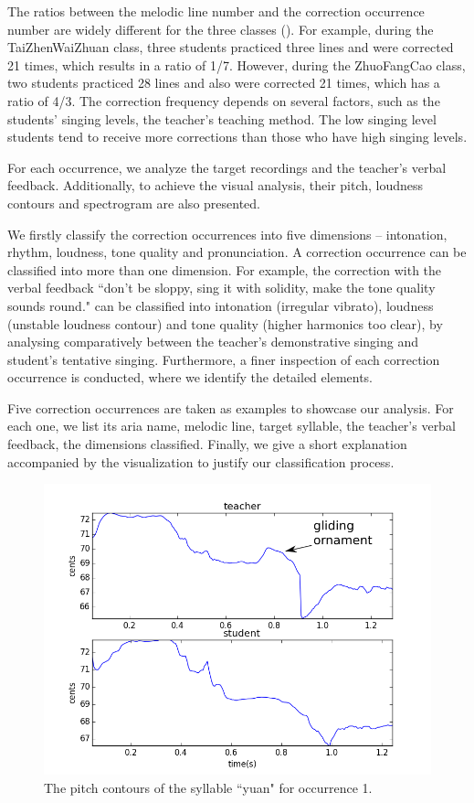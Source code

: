 The ratios between the melodic line number and the correction occurrence number are widely different for the three classes (). For example, during the TaiZhenWaiZhuan class, three students practiced three lines and were corrected 21 times, which results in a ratio of 1/7. However, during the ZhuoFangCao class, two students practiced 28 lines and also were corrected 21 times, which has a ratio of 4/3. The correction frequency depends on several factors, such as the students' singing levels, the teacher's teaching method. The low singing level students tend to receive more corrections than those who have high singing levels.

For each occurrence, we analyze the target recordings and the teacher's verbal feedback. Additionally, to achieve the visual analysis, their pitch, loudness contours and spectrogram are also presented.

We firstly classify the correction occurrences into five dimensions -- intonation, rhythm, loudness, tone quality and pronunciation. A correction occurrence can be classified into more than one dimension. For example, the correction with the verbal feedback ``don't be sloppy, sing it with solidity, make the tone quality sounds round." can be classified into intonation (irregular vibrato), loudness (unstable loudness contour) and tone quality (higher harmonics too clear), by analysing comparatively between the teacher's demonstrative singing and student's tentative singing. Furthermore, a finer inspection of each correction occurrence is conducted, where we identify the detailed elements.

Five correction occurrences are taken as examples to showcase our analysis. For each one, we list its aria name, melodic line, target syllable, the teacher's verbal feedback, the dimensions classified. Finally, we give a short explanation accompanied by the visualization to justify our classification process.

\begin{figure}[ht!]
\includegraphics[width=\textwidth]{figs/spectro_vis/ch3_occ1.png}
\caption{The pitch contours of the syllable ``yuan" for occurrence 1.}
\label{fig:occurrence_1}
\end{figure}


